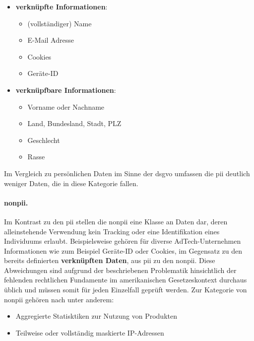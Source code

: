 \begin{itemize}
	\item \textbf{verknüpfte Informationen}:
		\begin{itemize}
			\item (vollständiger) Name
			\item E-Mail Adresse
			\item Cookies
			\item Geräte-ID
		\end{itemize}
	\item \textbf{verknüpfbare Informationen}:
		\begin{itemize}
			\item Vorname oder Nachname
			\item Land, Bundesland, Stadt, PLZ
			\item Geschlecht
			\item Rasse
		\end{itemize}
\end{itemize}

\noindent Im Vergleich zu persönlichen Daten im Sinne der \ac{dsgvo} umfassen die \acs{pii} deutlich weniger Daten, die in diese Kategorie fallen.


\paragraph{\acf{nonpii}.}
\label{sec:Grundlagen:para:Non Personal Identifiable Information}
Im Kontrast zu den \ac{pii} stellen die \ac{nonpii} eine Klasse an Daten dar, deren alleinstehende Verwendung kein Tracking oder eine Identifikation eines Individuums erlaubt. Beispielsweise gehören für diverse AdTech-Unternehmen Informationen wie zum Beispiel Geräte-ID oder Cookies, im Gegensatz zu den bereits definierten \textbf{verknüpften Daten}, aus \ac{pii} zu den \ac{nonpii}. Diese Abweichungen sind aufgrund der beschriebenen Problematik hinsichtlich der fehlenden rechtlichen Fundamente im amerikanischen Gesetzeskontext durchaus üblich und müssen somit für jeden Einzelfall geprüft werden. Zur Kategorie von \ac{nonpii} gehören nach \cite{Matuszewska2021} unter anderem:

\begin{itemize}
	\item Aggregierte Statisktiken zur Nutzung von Produkten
	\item Teilweise oder vollständig maskierte IP-Adressen
\end{itemize} 

